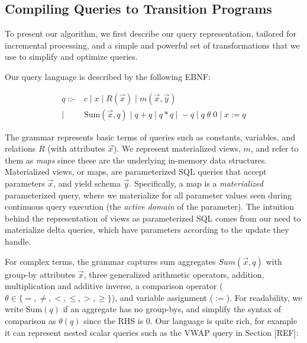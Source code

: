 {\vspace{1mm}
\subsection{Compiling Queries to Transition Programs}
\noindent To present our algorithm, we first describe our query representation,
tailored for incremental processing, and a simple and powerful set of transformations
that we use to simplify and optimize queries.

\noindent Our query language is described by the following EBNF:

\def \calcsum{\mbox{Sum}}
\def\calceq{\mbox{{\tt =}}}
\def\calcgt{\mbox{{\tt >}}}
\def\calcgte{\mbox{{\tt >=}}}
\def\calclte{\mbox{{\tt <=}}}
\def\calclt{\mbox{{\tt <}}}

\def \q{q}
\def \qa{q_1}
\def \qb{q_2}
\def \v#1{\mbox{#1}}
\def \vv#1{\mbox{{\tiny #1}}}
\def \z{\mathbb{Z}}

\vspace{-3mm}
\begin{align*} 
\q \; \mbox{::-} &
  \;    c \;|\; x
  \;|\; R(\vec{x}) \;|\; m(\vec{x},\vec{y})
\\
| & \; \calcsum(\vec{x}, \q)
  \;|\; \q + \q \;|\; \q * \q  \;|\; -\q
  \;|\; \q \; \theta \; 0 \;|\; x := \q
\end{align*}

The grammar represents basic terms of queries such as constants, variables, and
relations $R$ (with attributes $\vec{x}$). We represent materialized views, $m$,
and refer to them as \textit{maps} since these are the underlying in-memory data
structures. Materialized views, or maps, are parameterized SQL queries that
accept parameters $\vec{x}$, and yield schema $\vec{y}$.
Specifically, a map is a \textit{materialized} parameterized query,
where we materialize for all parameter values seen during continuous query
execution (the \textit{active domain} of the parameter).
The intuition behind the representation of views as parameterized SQL comes from
our need to materialize delta queries, which have parameters according to the
update they handle.

For complex terms, the grammar captures sum aggregates
$Sum(\vec{x},q)$ with group-by attributes $\vec{x}$, three generalized
arithmetic operators, addition, multiplication and additive inverse, a
comparison operator ($\theta \in \{=,\neq,<,\leq,>,\geq\}$), and variable
assignment ($:=$). For readability, we write $\calcsum(\q)$ if an aggregate
has no group-bys, and simplify the syntax of comparison as $\theta(\q)$ since
the RHS is 0. 
Our language is quite rich, for example it can represent nested scalar
queries such as the VWAP query in Section [REF]:

}
